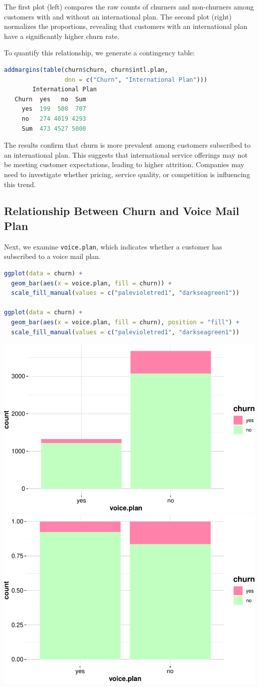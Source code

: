 \documentclass[
]{book}
\newcommand{\passthrough}[1]{#1}
\theoremstyle{definition}
\theoremstyle{definition}
\theoremstyle{definition}
\theoremstyle{definition}
\theoremstyle{remark}
\begin{document}
The first plot (left) compares the raw counts of churners and non-churners among customers with and without an international plan. The second plot (right) normalizes the proportions, revealing that customers with an international plan have a significantly higher churn rate.

To quantify this relationship, we generate a contingency table:

\begin{lstlisting}[language=R]
addmargins(table(churn$churn, churn$intl.plan, 
                 dnn = c("Churn", "International Plan")))
        International Plan
   Churn  yes   no  Sum
     yes  199  508  707
     no   274 4019 4293
     Sum  473 4527 5000
\end{lstlisting}

The results confirm that churn is more prevalent among customers subscribed to an international plan. This suggests that international service offerings may not be meeting customer expectations, leading to higher attrition. Companies may need to investigate whether pricing, service quality, or competition is influencing this trend.

\subsection*{Relationship Between Churn and Voice Mail Plan}\label{relationship-between-churn-and-voice-mail-plan}

Next, we examine \passthrough{\lstinline!voice.plan!}, which indicates whether a customer has subscribed to a voice mail plan.

\begin{lstlisting}[language=R]
ggplot(data = churn) + 
  geom_bar(aes(x = voice.plan, fill = churn)) +
  scale_fill_manual(values = c("palevioletred1", "darkseagreen1")) 

ggplot(data = churn) + 
  geom_bar(aes(x = voice.plan, fill = churn), position = "fill") +
  scale_fill_manual(values = c("palevioletred1", "darkseagreen1")) 
\end{lstlisting}

\includegraphics[width=0.5\linewidth]{EDA_files/figure-latex/unnamed-chunk-7-1} \includegraphics[width=0.5\linewidth]{EDA_files/figure-latex/unnamed-chunk-7-2}
\end{document}
